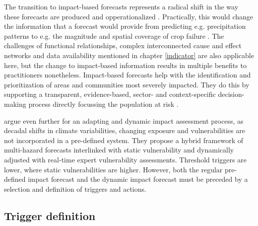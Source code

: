 The transition to impact-based forecasts represents a radical shift in the way these forecasts are produced and opperationalized \autocite{ifrcFbFPractitionersManual2023}. Practically, this would change the information that a forecast would provide from predicting e.g. precipitation patterns to e.g. the magnitude and spatial coverage of crop failure \autocite{harrowsmithFutureForecastImpact2020}. The challenges of functional relationships, complex interconnected cause and effect networks and data availability mentioned in chapter \ref*{indicator} are also applicable here, but the change to impact-based information results in multiple benefits to practitioners nonetheless. Impact-based forecasts help with the identification and prioritization of areas and communities most severely impacted. They do this by supporting a transparent, evidence-based, sector- and context-specific decision-making process directly focussing the population at risk \autocite{ifrcFbFPractitionersManual2023}.

\autocite{boultDroughtImpactbasedForecasting2022} argue even further for an adapting and dynamic impact assessment process, as decadal shifts in climate variabilities, changing exposure and vulnerabilities are not incorporated in a pre-defined system. They propose a hybrid framework of multi-hazard forecasts interlinked with static vulnerability and dynamically adjusted with real-time expert vulnerability assessments. Threshold triggers are lower, where static vulnerabilities are higher. However, both the regular pre-defined impact forecast and the dynamic impact forecast must be preceded by a selection and definition of triggers and actions.

\subsection*{Trigger definition}

